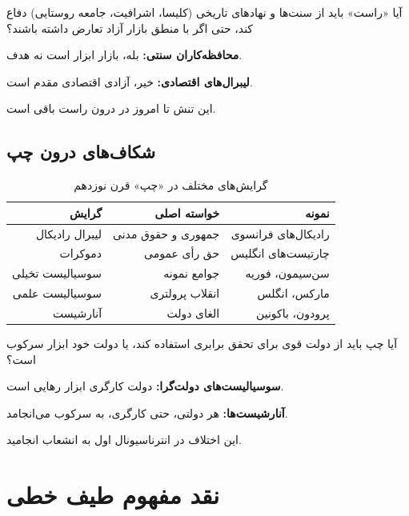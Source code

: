 \begin{debatebox}
آیا «راست» باید از سنت‌ها و نهادهای تاریخی (کلیسا، اشرافیت، جامعه روستایی) دفاع کند، حتی اگر با منطق بازار آزاد تعارض داشته باشند؟

\textbf{محافظه‌کاران سنتی:} بله، بازار ابزار است نه هدف.

\textbf{لیبرال‌های اقتصادی:} خیر، آزادی اقتصادی مقدم است.

این تنش تا امروز در درون راست باقی است.
\end{debatebox}

\subsection{شکاف‌های درون چپ}

\begin{table}[htbp]
\centering
\caption{گرایش‌های مختلف در «چپ» قرن نوزدهم}
\label{tab:left-factions}
\begin{tabular}{r|r|r}
\toprule
\textbf{گرایش} & \textbf{خواسته اصلی} & \textbf{نمونه} \\
\midrule
لیبرال رادیکال & جمهوری و حقوق مدنی & رادیکال‌های فرانسوی \\
دموکرات & حق رأی عمومی & چارتیست‌های انگلیس \\
سوسیالیست تخیلی & جوامع نمونه & سن‌سیمون، فوریه \\
سوسیالیست علمی & انقلاب پرولتری & مارکس، انگلس \\
آنارشیست & الغای دولت & پرودون، باکونین \\
\bottomrule
\end{tabular}
\end{table}

\begin{debatebox}
آیا چپ باید از دولت قوی برای تحقق برابری استفاده کند، یا دولت خود ابزار سرکوب است؟

\textbf{سوسیالیست‌های دولت‌گرا:} دولت کارگری ابزار رهایی است.

\textbf{آنارشیست‌ها:} هر دولتی، حتی کارگری، به سرکوب می‌انجامد.

این اختلاف در انترناسیونال اول به انشعاب انجامید.
\end{debatebox}

\section{نقد مفهوم طیف خطی}

